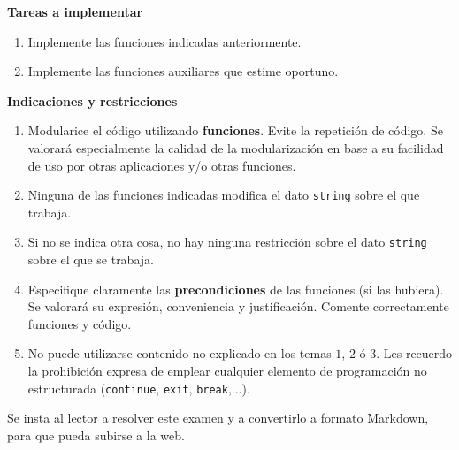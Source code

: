 \documentclass[12pt]{article}
\begin{document}
\begin{ejercicio}[10 puntos]
        \noindent\textbf{Tareas a implementar}

        \begin{enumerate}[label=\arabic*.]
            \item Implemente las funciones indicadas anteriormente.
            \item Implemente las funciones auxiliares que estime oportuno.
        \end{enumerate}

        \noindent\textbf{Indicaciones y restricciones}

        \begin{enumerate}[label=\arabic*.]
            \item Modularice el código utilizando \textbf{funciones}. Evite la repetición de código. Se valorará especialmente la calidad de la modularización en base a su facilidad de uso por otras aplicaciones y/o otras funciones.
            \item Ninguna de las funciones indicadas modifica el dato \texttt{string} sobre el que trabaja.
            \item Si no se indica otra cosa, no hay ninguna restricción sobre el dato \texttt{string} sobre el que se trabaja.
            \item Especifique claramente las \textbf{precondiciones} de las funciones (si las hubiera). Se valorará su expresión, conveniencia y justificación. Comente correctamente funciones y código.
            \item No puede utilizarse contenido no explicado en los temas $1$, $2$ ó $3$. Les recuerdo la prohibición expresa de emplear cualquier elemento de programación no estructurada (\texttt{continue}, \texttt{exit}, \texttt{break},...).
        \end{enumerate}
    \end{ejercicio}

    \begin{observacion}
        Se insta al lector a resolver este examen y a convertirlo a formato Markdown, para que pueda subirse a la web.
    \end{observacion}

    \newpage
    \setcounter{ejercicio}{0} %
\end{document}
